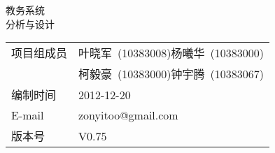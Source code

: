 \begin{titlepage}
  \vspace*{\fill}
  \begin{center}
    \fontsize{50pt}{12pt}
    教务系统\\\vspace{2ex} \fontsize{40pt}{12pt}分析与设计\\\vspace{40ex}
    \Large 
    \begin{tabular}{ll}
      项目组成员 & 叶晓军~(10383008)\quad 杨曦华~(10383000)\\
      & 柯毅豪~(10383000)\quad 钟宇腾~(10383067)\\
      编制时间 & 2012-12-20\\
      E-mail & zonyitoo@gmail.com\\
      版本号 & V0.75
    \end{tabular}
  \end{center}
  \vspace*{\fill}
\end{titlepage}
